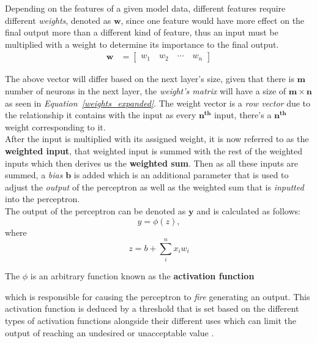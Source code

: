 \documentclass[12pt]{extarticle}
\begin{document}
	Depending on the features of a given model data, different features require different \emph{weights}, denoted as $\bm{w}$, since one feature would have more effect on the final output more than a different kind of feature, thus an input must be multiplied with a weight to determine its importance to the final output.\\
	\begin{align}
		\bm{w} &= \begin{bmatrix}\label{weights}
			w_1 \quad
			w_2 \quad
			\cdots \quad
			w_n
		\end{bmatrix}
	\end{align}
	
	The above vector will differ based on the next layer's size, given that there is $\bm{m}$ number of neurons in the next layer, the \emph{weight's matrix} will have a size of $\bm{m \times n}$ as seen in \emph{Equation~\ref{weights_expanded}}. The weight vector is a \emph{row vector} due to the relationship it contains with the input as every $\bm{n^{th}}$ input, there's a $\bm{n^{th}}$ weight corresponding to it.\\[5mm]
	After the input is multiplied with its assigned weight, it is now referred to as the \textbf{weighted input}, that weighted input is summed with the rest of the weighted inputs which then derives us the \textbf{weighted sum}. Then as all these inputs are summed, a \emph{bias} $\bm{b}$ is added which is an additional parameter that is used to adjust the \emph{output} of the perceptron as well as the weighted sum that is \emph{inputted} into the perceptron.\\[5mm]
	\newpage
	The output of the perceptron can be denoted as $\bm{y}$ and is calculated as follows:
	\begin{equation}\label{output}
		y = \phi{(z)},
	\end{equation}
	where
	\begin{equation}\label{z}
		z = b + \sum_{i}^{n} x_i w_i
	\end{equation}
	
	The $\phi$ is an arbitrary function known as the \textbf{activation function} \cite{agarap2018deep} 
	
	
	which is responsible for causing the perceptron to \emph{fire} generating an output. This activation function is deduced by a threshold that is set based on the different types of activation functions alongside their different uses which can limit the output of reaching an undesired or unacceptable value \cite{siddique2013computational}.\\[5mm]
	
\end{document}
